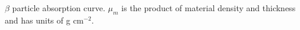 $\beta$ particle absorption curve. $\mu_m$ is the product of material density and thickness and has units of g cm$^{-2}$.